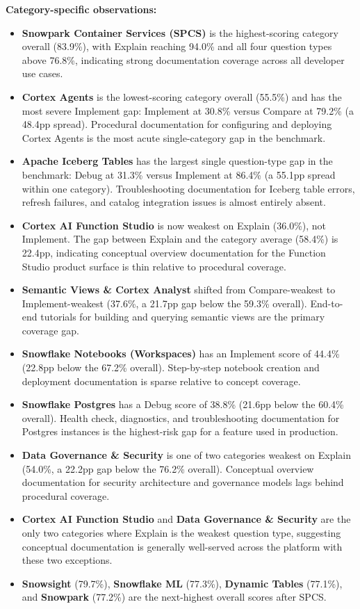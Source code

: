 \documentclass[10pt,letterpaper]{article}
\begin{document}
\textbf{Category-specific observations:}

\begin{itemize}[nosep]
  \item \textbf{Snowpark Container Services (SPCS)} is the highest-scoring category overall (83.9\%), with Explain reaching 94.0\% and all four question types above 76.8\%, indicating strong documentation coverage across all developer use cases.
  \item \textbf{Cortex Agents} is the lowest-scoring category overall (55.5\%) and has the most severe Implement gap: Implement at 30.8\% versus Compare at 79.2\% (a 48.4pp spread). Procedural documentation for configuring and deploying Cortex Agents is the most acute single-category gap in the benchmark.
  \item \textbf{Apache Iceberg Tables} has the largest single question-type gap in the benchmark: Debug at 31.3\% versus Implement at 86.4\% (a 55.1pp spread within one category). Troubleshooting documentation for Iceberg table errors, refresh failures, and catalog integration issues is almost entirely absent.
  \item \textbf{Cortex AI Function Studio} is now weakest on Explain (36.0\%), not Implement. The gap between Explain and the category average (58.4\%) is 22.4pp, indicating conceptual overview documentation for the Function Studio product surface is thin relative to procedural coverage.
  \item \textbf{Semantic Views \& Cortex Analyst} shifted from Compare-weakest to Implement-weakest (37.6\%, a 21.7pp gap below the 59.3\% overall). End-to-end tutorials for building and querying semantic views are the primary coverage gap.
  \item \textbf{Snowflake Notebooks (Workspaces)} has an Implement score of 44.4\% (22.8pp below the 67.2\% overall). Step-by-step notebook creation and deployment documentation is sparse relative to concept coverage.
  \item \textbf{Snowflake Postgres} has a Debug score of 38.8\% (21.6pp below the 60.4\% overall). Health check, diagnostics, and troubleshooting documentation for Postgres instances is the highest-risk gap for a feature used in production.
  \item \textbf{Data Governance \& Security} is one of two categories weakest on Explain (54.0\%, a 22.2pp gap below the 76.2\% overall). Conceptual overview documentation for security architecture and governance models lags behind procedural coverage.
  \item \textbf{Cortex AI Function Studio} and \textbf{Data Governance \& Security} are the only two categories where Explain is the weakest question type, suggesting conceptual documentation is generally well-served across the platform with these two exceptions.
  \item \textbf{Snowsight} (79.7\%), \textbf{Snowflake ML} (77.3\%), \textbf{Dynamic Tables} (77.1\%), and \textbf{Snowpark} (77.2\%) are the next-highest overall scores after SPCS.
\end{itemize}
\end{document}
